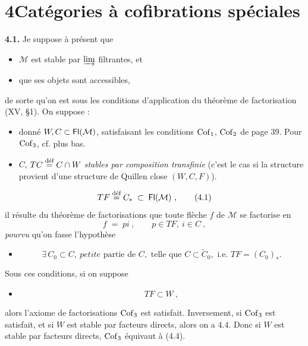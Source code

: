\section*{4\quad Catégories à cofibrations spéciales}

\textbf{4.1.} Je suppose à présent que
\begin{itemize}[leftmargin=3em]
\item[\circled{a}] $\mathcal{M}$ est stable par $\varinjlim$ filtrantes, et
\item[\circled{b}] que ses objets sont accessibles,
\end{itemize}
de sorte qu'on est sous les conditions d'application du théorème de factorisation (XV, \S1). On suppose :
\begin{itemize}[leftmargin=3em]
\item[\circled{c}] donné $W, C \subset \Fl(\mathcal{M})$, satisfaisant les conditions $\Cof_1$, $\Cof_2$ de page 39. Pour $\Cof_3$, cf. plus bas.
\item[\circled{d}] $C$, $TC \defeq C \cap W$ \textit{stables par composition transfinie} (c'est le cas si la structure provient d'une structure de Quillen close $(W, C, F)$).
\end{itemize}
\[
TF \defeq C_* \;\subset\; \Fl(\mathcal{M})\ , \tag*{(4.1)}
\]
il résulte du théorème de factorisations que toute flèche $f$ de $\mathcal{M}$ se factorise en
\[
f \;=\; pi\ , \qquad p \in TF,\ i \in C\ ,
\]
\textit{pourvu} qu'on fasse l'hypothèse
\begin{itemize}[leftmargin=3em]
\item[\circled{e}] \mbox{}
\[
\exists\, C_0 \subset C,\ \textit{petite} \text{ partie de } C, \text{ telle que } C \subset \tilde{C}_0, \text{ i.e. } TF = (C_0)_*. \tag*{(4.3)}
\]
\end{itemize}
Sous ces conditions, si on suppose
\begin{itemize}[leftmargin=3em]
\item[\circled{f}] \mbox{}
\[
TF \subset W\ , \tag*{(4.4)}
\]
\end{itemize}
alors l'axiome de factorisations $\Cof_3$ est satisfait. Inversement, si $\Cof_3$ est satisfait, et si $W$ est stable par facteurs directs, alors on a 4.4. Donc si $W$ est stable par facteurs directs, $\Cof_3$ équivaut à (4.4).

